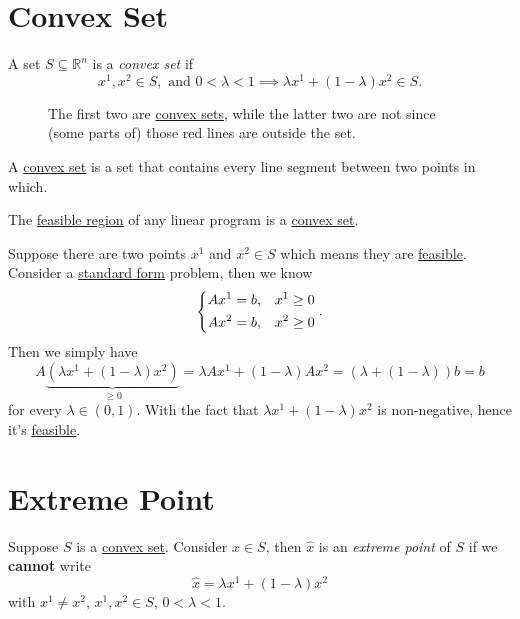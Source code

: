 \section{Convex Set}
\begin{definition}\label{def:convex-set}
	A set \(S\subseteq \mathbb{R}^n\) is a \emph{convex set} if
	\[
		x^1, x^2\in S, \text{ and }0<\lambda<1 \implies \lambda x^1 + (1-\lambda)x^2 \in S.
	\]
	\begin{figure}[H]
		\centering
		\caption{The first two are \hyperref[def:convex-set]{convex sets}, while the latter two are not since (some parts of) those red lines are outside the set.}
		\label{fig:convex-set}
	\end{figure}
\end{definition}

\begin{intuition}
	A \hyperref[def:convex-set]{convex set} is a set that contains every line segment between two points in which.
\end{intuition}

\begin{remark}
	The \hyperref[def:feasible-region]{feasible region} of any linear program is a \hyperref[def:convex-set]{convex set}.
\end{remark}
\begin{explanation}
	Suppose there are two points \(x^1\) and \(x^2\in S\) which means they are \hyperref[def:feasible-solution]{feasible}. Consider a
	\hyperref[def:standard-form]{standard form} problem, then we know
	\[
		\begin{dcases}
			Ax^1 = b, & x^1\geq 0 \\
			Ax^2 = b, & x^2\geq 0 \\
		\end{dcases}.
	\]
	Then we simply have
	\[
		A\underbrace{(\lambda x^1 + (1-\lambda)x^2)}_{\geq 0} = \lambda A x^1 + (1-\lambda)A x^2 = (\lambda + (1-\lambda))b = b
	\]
	for every \(\lambda \in (0,1)\). With the fact that \(\lambda x^1 + (1-\lambda)x^2\) is non-negative, hence it's \hyperref[def:feasible-solution]{feasible}.
\end{explanation}

\section{Extreme Point}
\begin{definition}\label{def:extreme-point}
	Suppose \(S\) is a \hyperref[def:convex-set]{convex set}. Consider \(\hat{x} \in S\), then \(\hat{x}\) is an \emph{extreme point} of \(S\) if we \textbf{cannot} write
	\[
		\hat{x} = \lambda x^1 + (1-\lambda)x^2
	\]
	with \(x^1 \neq x^2\), \(x^1, x^2\in S\), \(0<\lambda<1\).
\end{definition}

